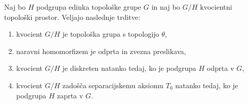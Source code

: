 \documentclass[mat1]{fmfdelo}
\begin{document}
\begin{izrek}\label{izr:kvocpovzetek}
Naj bo $H$ podgrupa edinka topološke grupe $G$ in naj bo $G/H$ kvocientni topološki prostor. Veljajo naslednje trditve:
\begin{enumerate}
\item kvocient $G/H$ je topološka grupa s topologijo $\theta$,\label{podtrd:kvoc1}
\item naravni homomorfizem je odprta in zvezna preslikava,\label{podtrd:kvoc2}
\item kvocient $G/H$ je diskreten natanko tedaj, ko je podgrupa $H$ odprta v $G$,\label{podtrd:kvoc3}
\item kvocient $G/H$ zadošča separacijskemu aksiomu $T_0$ natanko tedaj, ko je pod\-gru\-pa $H$ zaprta v $G$.\label{podtrd:kvoc4}
\end{enumerate}
\end{izrek}
\end{document}
